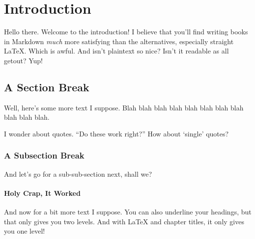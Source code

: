 \chapter*{Introduction}

Hello there. Welcome to the introduction! I believe that you'll find
writing books in Markdown \emph{much} more satisfying than the
alternatives, especially straight LaTeX. Which is awful. And isn't
plaintext so nice? Isn't it readable as all getout? Yup!

\section{A Section Break}

Well, here's some more text I suppose. Blah blah blah blah blah blah
blah blah blah blah blah.

I wonder about quotes. ``Do these work right?'' How about `single'
quotes?

\subsection{A Subsection Break}

And let's go for a sub-sub-section next, shall we?

\subsubsection{Holy Crap, It Worked}

And now for a bit more text I suppose. You can also underline your
headings, but that only gives you two levels. And with LaTeX and chapter
titles, it only gives you one level!
